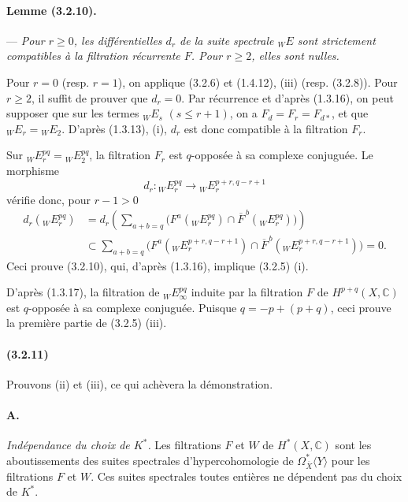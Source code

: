 \documentclass[10pt]{article}
\newcommand{\C}{\mathbb C}
\begin{document}
\paragraph{Lemme (3.2.10).} --- {\itshape Pour $r\ge0$, les différentielles $d_r$ de la suite spectrale ${}_WE$ sont strictement compatibles à la filtration récurrente $F$. Pour $r\ge2$, elles sont nulles.}

Pour $r=0$ (resp. $r=1$), on applique (3.2.6) et (1.4.12), (iii) (resp. (3.2.8)). Pour $r\ge2$, il suffit de prouver que $d_r=0$. Par récurrence et d'après (1.3.16), on peut supposer que sur les termes ${}_WE_s$ $(s\le r+1)$, on a $F_d=F_r=F_{d*}$, et que ${}_WE_r={}_WE_2$. D'après (1.3.13), (i), $d_r$ est donc compatible à la filtration $F_r$.

Sur ${}_WE_r^{pq}={}_WE_2^{pq}$, la filtration $F_r$ est $q$-opposée à sa complexe conjuguée. Le morphisme
\[
d_r:{}_W E_r^{pq}\longrightarrow {}_W E_r^{p+r,q-r+1}
\]
vérifie donc, pour $r-1>0$
\[
\begin{aligned}
d_r({}_W E_r^{pq})
&=d_r\!\left(\sum_{a+b=q}\bigl(F^a({}_W E_r^{pq})\cap
\overline F^{\,b}({}_W E_r^{pq})\bigr)\right)\\
&\subset
\sum_{a+b=q}\bigl(F^a({}_WE_r^{p+r,q-r+1})\cap
\overline F^{\,b}({}_WE_r^{p+r,q-r+1})\bigr)=0.
\end{aligned}
\]
Ceci prouve (3.2.10), qui, d'après (1.3.16), implique (3.2.5) (i).

D'après (1.3.17), la filtration de ${}_WE_\infty^{pq}$ induite par la filtration $F$ de $H^{p+q}(X,\C)$ est $q$-opposée à sa complexe conjuguée. Puisque $q=-p+(p+q)$, ceci prouve la première partie de (3.2.5) (iii).

\paragraph{(3.2.11)} Prouvons (ii) et (iii), ce qui achèvera la démonstration.

\paragraph{A.} \textit{Indépendance du choix de $K^{*}$.} Les filtrations $F$ et $W$ de $H^*(X,\C)$ sont les aboutissements des suites spectrales d'hypercohomologie de $\Omega_{\overline X}^{*}\langle Y\rangle$ pour les filtrations $F$ et $W$. Ces suites spectrales toutes entières ne dépendent pas du choix de $K^{*}$.
\end{document}
